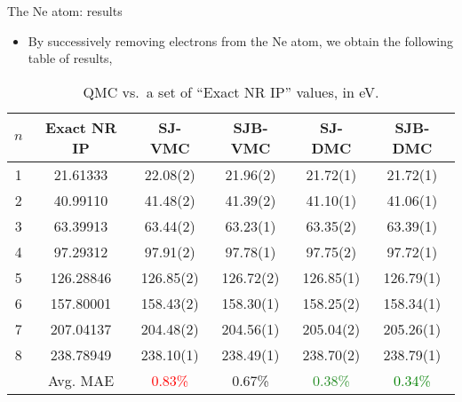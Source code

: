 \documentclass[12pt, pdf, hyperref={draft}, usenames, dvipsnames,
aspectratio=169]{beamer}
\begin{document}
\begin{frame}{The Ne atom: results}

\begin{itemize}
  \item By successively removing electrons from the Ne atom, we obtain the
  following table of results,

\end{itemize}

\begin{table}[H]
  \centering
  \begin{tabular}{cccccc}
$n$ & Exact NR IP & SJ-VMC & SJB-VMC & SJ-DMC & SJB-DMC  \\ \hline
 1 & 21.61333 & 22.08(2)  & 21.96(2)  & 21.72(1)  & 21.72(1)  \\
 2 & 40.99110 & 41.48(2)  & 41.39(2)  & 41.10(1)  & 41.06(1)  \\
 3 & 63.39913 & 63.44(2)  & 63.23(1)  & 63.35(2)  & 63.39(1)  \\
 4 & 97.29312 & 97.91(2)  & 97.78(1)  & 97.75(2)  & 97.72(1)  \\
 5 &126.28846 & 126.85(2) & 126.72(2) & 126.85(1) & 126.79(1) \\
 6 &157.80001 & 158.43(2) & 158.30(1) & 158.25(2) & 158.34(1) \\
 7 &207.04137 & 204.48(2) & 204.56(1) & 205.04(2) & 205.26(1) \\
 8 &238.78949 & 238.10(1) & 238.49(1) & 238.70(2) & 238.79(1) \\
 \hline
 { }& Avg. MAE & \textcolor{red}{0.83\%}    & \textcolor{BurntOrange}{0.67\%}
 & \textcolor{ForestGreen}{0.38\%}    & \textcolor{green}{0.34\%}

  \end{tabular}
  \caption{QMC vs.\ a set of ``Exact NR IP''
  values, in eV.}\label{tab:neon_ips}
\end{table}
\end{frame}
\end{document}
